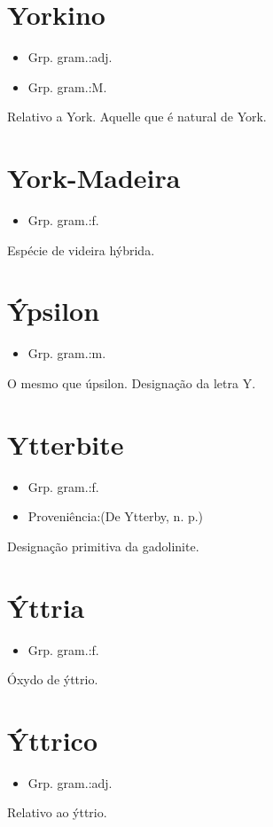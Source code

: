 \section{Yorkino}
\begin{itemize}
\item {Grp. gram.:adj.}
\end{itemize}
\begin{itemize}
\item {Grp. gram.:M.}
\end{itemize}
Relativo a York.
Aquelle que é natural de York.
\section{York-Madeira}
\begin{itemize}
\item {Grp. gram.:f.}
\end{itemize}
Espécie de videira hýbrida.
\section{Ýpsilon}
\begin{itemize}
\item {Grp. gram.:m.}
\end{itemize}
O mesmo que \textunderscore úpsilon\textunderscore .
Designação da letra \textunderscore Y\textunderscore .
\section{Ytterbite}
\begin{itemize}
\item {Grp. gram.:f.}
\end{itemize}
\begin{itemize}
\item {Proveniência:(De \textunderscore Ytterby\textunderscore , n. p.)}
\end{itemize}
Designação primitiva da \textunderscore gadolinite\textunderscore .
\section{Ýttria}
\begin{itemize}
\item {Grp. gram.:f.}
\end{itemize}
Óxydo de ýttrio.
\section{Ýttrico}
\begin{itemize}
\item {Grp. gram.:adj.}
\end{itemize}
Relativo ao ýttrio.
